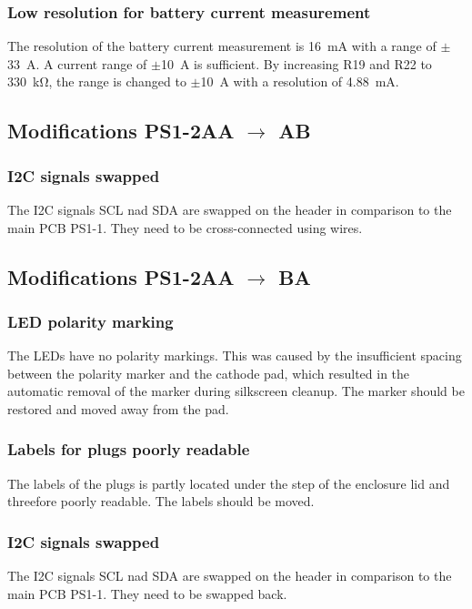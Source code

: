 \subsubsection{Low resolution for battery current measurement}
The resolution of the battery current measurement is \qty{16}{\milli\ampere} with a range of $\pm$\qty{33}{\ampere}. A current range of $\pm$\qty{10}{\ampere} is sufficient. By increasing R19 and R22 to \qty{330}{\kilo\ohm}, the range is changed to $\pm$\qty{10}{\ampere} with a resolution of \qty{4.88}{\milli\ampere}. 

\subsection{Modifications PS1-2AA $\to$ AB}

\subsubsection{\acs{I2C} signals swapped}
The \ac{I2C} signals SCL nad SDA are swapped on the header in comparison to the main PCB PS1-1. They need to be cross-connected using wires. 

\subsection{Modifications PS1-2AA $\to$ BA}

\subsubsection{LED polarity marking}
The LEDs have no polarity markings. This was caused by the insufficient spacing between the polarity marker and the cathode pad, which resulted in the automatic removal of the marker during silkscreen cleanup. The marker should be restored and moved away from the pad. 

\subsubsection{Labels for plugs poorly readable}
The labels of the plugs is partly located under the step of the enclosure lid and threefore poorly readable. The labels should be moved. 

\subsubsection{\acs{I2C} signals swapped}
The \ac{I2C} signals SCL nad SDA are swapped on the header in comparison to the main PCB PS1-1. They need to be swapped back. 

